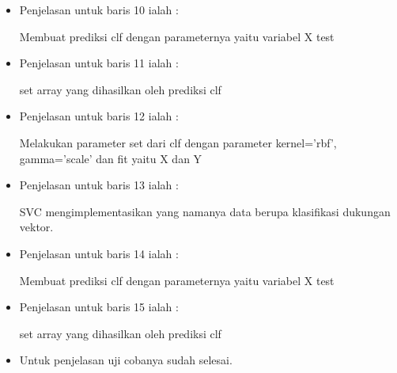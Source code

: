 \begin{enumerate}
\begin{itemize}
\begin{enumerate}
\begin{itemize}
\par
\item Penjelasan untuk baris 10 ialah :
\par Membuat prediksi clf dengan parameternya yaitu variabel X test
\par
\item Penjelasan untuk baris 11 ialah :
\par set array yang dihasilkan oleh prediksi clf
\par
\item Penjelasan untuk baris 12 ialah :
\par Melakukan parameter set dari clf dengan parameter kernel='rbf', gamma='scale' dan fit yaitu X dan Y
\par
\item Penjelasan untuk baris 13 ialah :
\par  SVC mengimplementasikan yang namanya data berupa klasifikasi dukungan vektor.
\par
\item Penjelasan untuk baris 14 ialah :
\par Membuat prediksi clf dengan parameternya yaitu variabel X test
\par
\item Penjelasan untuk baris 15 ialah :
\par set array yang dihasilkan oleh prediksi clf
\par
\item Untuk penjelasan uji cobanya sudah selesai.
\par

\end{itemize}




\end{enumerate}
\end{itemize}
\end{enumerate}
